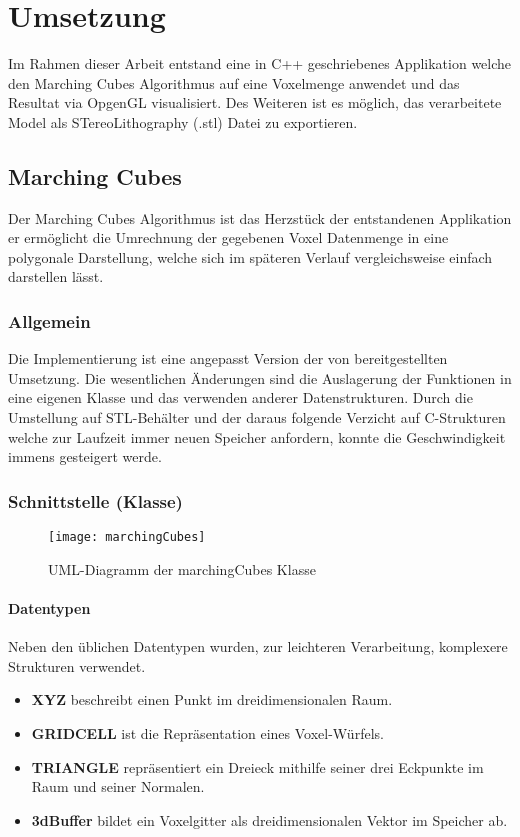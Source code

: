 \chapter{Umsetzung}
Im Rahmen dieser Arbeit entstand eine in C++ geschriebenes Applikation welche den Marching Cubes Algorithmus auf eine Voxelmenge anwendet und das Resultat via OpgenGL visualisiert. Des Weiteren ist es möglich, das verarbeitete Model als STereoLithography (.stl) Datei zu exportieren.
\section{Marching Cubes}
\label{sec:mcUms}
Der Marching Cubes Algorithmus ist das Herzstück der entstandenen Applikation er ermöglicht die Umrechnung der gegebenen Voxel Datenmenge in eine polygonale Darstellung, welche sich im späteren Verlauf vergleichsweise einfach darstellen lässt.
\subsection{Allgemein}
Die Implementierung ist eine angepasst Version der von \citep{BourkeMC} bereitgestellten Umsetzung. Die wesentlichen Änderungen sind die Auslagerung der Funktionen in eine eigenen Klasse und das verwenden anderer Datenstrukturen. Durch die Umstellung auf STL-Behälter und der daraus folgende Verzicht auf C-Strukturen welche zur Laufzeit immer neuen Speicher anfordern, konnte die Geschwindigkeit immens gesteigert werde.
\subsection{Schnittstelle (Klasse)}
\begin{figure}[H]
	\centering
	\texttt{[image: marchingCubes]}
	\caption{UML-Diagramm der marchingCubes Klasse}
	\label{fig:marchingCubes}
\end{figure}

\subsubsection{Datentypen}
Neben den üblichen Datentypen wurden, zur leichteren Verarbeitung, komplexere Strukturen verwendet.\\
\begin{itemize}
	\item \textbf{XYZ} beschreibt einen Punkt im dreidimensionalen Raum.
	\item \textbf{GRIDCELL} ist die Repräsentation eines Voxel-Würfels. 
	\item \textbf{TRIANGLE} repräsentiert ein Dreieck mithilfe seiner drei Eckpunkte im Raum und seiner Normalen.
	\item \textbf{3dBuffer} bildet ein Voxelgitter als dreidimensionalen Vektor im Speicher ab.
\end{itemize}

